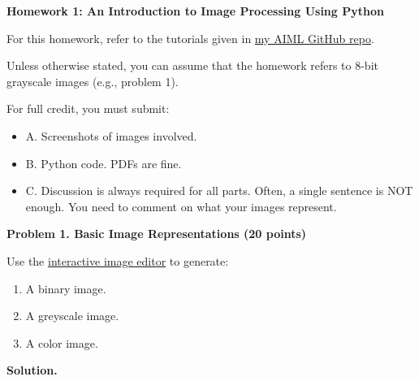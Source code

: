 \documentclass[11pt]{article}
\begin{document}
	
	\noindent
	\textbf{Homework 1: An Introduction to Image Processing Using Python}
	
	For this homework, refer to the tutorials given in 
	\href{https://github.com/pattichis/AIML}{my AIML GitHub repo}.
	
	Unless otherwise stated, you can assume that the homework refers to 8-bit grayscale images (e.g., problem 1).
	
	For full credit, you must submit:
	\begin{itemize}
		\item A. Screenshots of images involved.
		\item B. Python code. PDFs are fine.
		\item C. Discussion is always required for all parts. Often, a single sentence is NOT enough. You need to comment on what your images represent.
	\end{itemize}
	
	\vspace{1em}
	
	\noindent
	\textbf{Problem 1. Basic Image Representations (20 points)}
	
	Use the 
	\href{http://ivpcl.unm.edu/ivpclpages/Research/aolme/app/interactive-img-v2.html}{interactive image editor}
	to generate:
	
	\begin{enumerate}[label=\textbf{\Alph*.}, leftmargin=1.2cm]
		\item A binary image.
		\item A greyscale image.
		\item A color image.
	\end{enumerate}
	
	\vspace{1em}
	\noindent\textbf{Solution.}
	
\end{document}
